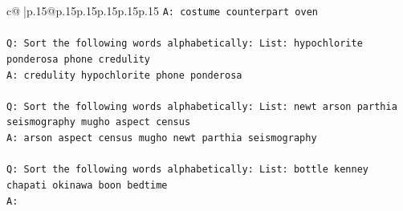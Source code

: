 \documentclass{article}
\begin{document}
{\begin{supertabular}{c@{$\;$}|p{.15\linewidth}@{}p{.15\linewidth}p{.15\linewidth}p{.15\linewidth}p{.15\linewidth}p{.15\linewidth}}
{{{\texttt{A: costume counterpart oven} \\
\\ 
\texttt{Q: Sort the following words alphabetically: List: hypochlorite ponderosa phone credulity} \\
\texttt{A: credulity hypochlorite phone ponderosa} \\
\\ 
\texttt{Q: Sort the following words alphabetically: List: newt arson parthia seismography mugho aspect census} \\
\texttt{A: arson aspect census mugho newt parthia seismography} \\
\\ 
\texttt{Q: Sort the following words alphabetically: List: bottle kenney chapati okinawa boon bedtime} \\
\texttt{A:} \\
            }
        }
    }
     \\ \\


\end{supertabular}}
\end{document}
